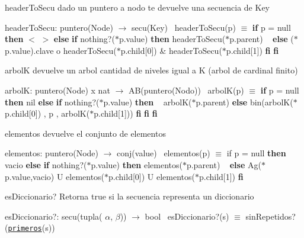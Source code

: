 \begin{DoxyParagraph}{header\+To\+Secu}
dado un puntero a nodo te devuelve una secuencia de Key

header\+To\+Secu\+: puntero(\+Node) $\to$ secu(\+Key)~\newline
 header\+To\+Secu(p) $\equiv$ {\bfseries if} p = null {\bfseries then} $<$ $>$ {\bfseries else} {\bfseries if} nothing?($\ast$p.value) {\bfseries then} header\+To\+Secu($\ast$p.parent) ~\newline
 {\bfseries else} ($\ast$p.value).clave o header\+To\+Secu($\ast$p.child\mbox{[}0\mbox{]}) \& header\+To\+Secu($\ast$p.child\mbox{[}1\mbox{]}) {\bfseries fi} {\bfseries fi} 
\end{DoxyParagraph}


\begin{DoxyParagraph}{arbolK}
devuelve un arbol cantidad de niveles igual a K (arbol de cardinal finito)

arbolK\+: puntero(\+Node) x nat $\to$ A\+B(puntero(\+Nodo))~\newline
 arbol\+K(p) $\equiv$ {\bfseries if} p = null {\bfseries then} nil {\bfseries else} {\bfseries if} nothing?($\ast$p.value) {\bfseries then} ~\newline
 arbolK($\ast$p.parent) {\bfseries else} bin(arbolK($\ast$p.child\mbox{[}0\mbox{]}) , p , arbolK($\ast$p.child\mbox{[}1\mbox{]})) {\bfseries fi} {\bfseries fi} {\bfseries fi} 
\end{DoxyParagraph}


\begin{DoxyParagraph}{elementos}
devuelve el conjunto de elementos

elementos\+: puntero(\+Node) $\to$ conj(value)~\newline
 elementos(p) $\equiv$ if p = null {\bfseries then} vacio {\bfseries else} {\bfseries if} nothing?($\ast$p.value) {\bfseries then} elementos($\ast$p.parent) ~\newline
 {\bfseries else} Ag($\ast$p.value,vacio) U elementos($\ast$p.child\mbox{[}0\mbox{]}) U elementos($\ast$p.child\mbox{[}1\mbox{]}) {\bfseries fi} 
\end{DoxyParagraph}


\begin{DoxyParagraph}{es\+Diccionario?}
Retorna true si la secuencia representa un diccionario

es\+Diccionario?\+: secu(tupla( $\alpha$, $\beta$)) $\to$ bool~\newline
 es\+Diccionario?(s) $\equiv$ sin\+Repetidos?(\href{axiomas.html#primeros}{\tt primeros}(s)) 
\end{DoxyParagraph}


